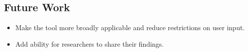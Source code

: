 \documentclass[5pt,clinic]{hmcposter}
\begin{document}
\begin{poster}
\section{Future Work}
\begin{itemize}
\item Make the tool more broadly applicable and reduce restrictions on user input.
\item Add ability for researchers to share their findings.
\end{itemize}



{}


\end{poster}
\end{document}
